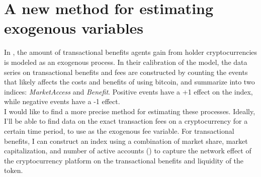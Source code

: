 \documentclass[12pt]{article}
\begin{document}
\section{A new method for estimating exogenous variables}
In \cite{biais2020equilibrium}, the amount of transactional benefits agents gain from holder cryptocurrencies is modeled as an exogenous process. In their calibration of the model, the data series on transactional benefits and fees are constructed by counting the events that likely affects the costs and benefits of using bitcoin, and summarize into two indices: \textit{MarketAccess} and \textit{Benefit}. Positive events have a +1 effect on the index, while negative events have a -1 effect.\\
I would like to find a more precise method for estimating these processes. Ideally, I'll be able to find data on the exact transaction fees on a cryptocurrency for a certain time period, to use as the exogenous fee variable. For transactional benefits, I can construct an index using a combination of market share, market capitalization, and number of active accounts (\cite{cong2021tokenomics, cong2022token}) to capture the network effect of the cryptocurrency platform on the transactional benefits and liquidity of the token.



\printbibliography
\end{document}
